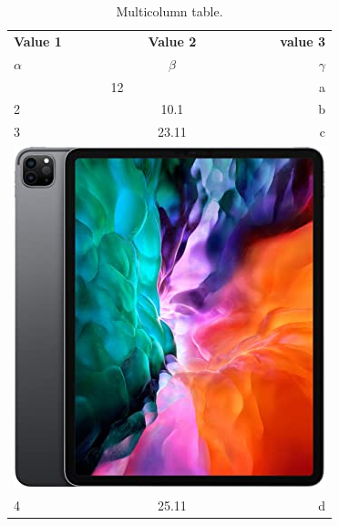 \documentclass{article}
\begin{document}
\begin{table}[h!]
	\begin{center}
		\caption{Multicolumn table.}
		\label{tab:table1}
		\begin{tabular}{|l|c|r|}
			\hline
			\textbf{Value 1} & \textbf{Value 2} & \textbf{value 3}\\
			$\alpha$ & $\beta$ & $\gamma$ \\
			\hline
			\multicolumn{2}{|c|}{12} & a\\
			\hline
			2 & 10.1 & b\\
			3 & 23.11 & c\\
			\hline
			\multicolumn{3}{|c|}{\includegraphics[width=0.15\linewidth]{picture2}}\\
			\hline
			4 & 25.11 & d\\
			\hline
		\end{tabular}
	\end{center}
\end{table}
\end{document}
